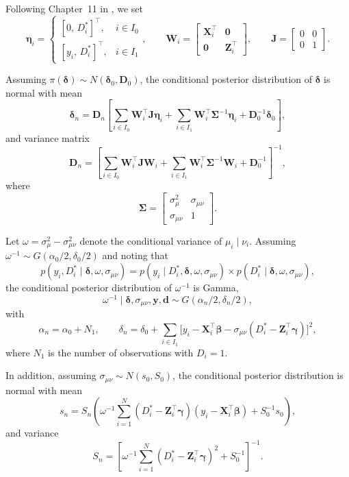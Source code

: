 Following Chapter~11 in \cite{greenberg2012introduction}, we set
\[
\boldsymbol{\eta}_i=
\begin{cases}
	[0, \, D_i^*]^{\top}, & i\in I_0\\
	[y_i, \, D_i^*]^{\top}, & i\in I_1
\end{cases},
\qquad
\mathbf{W}_i=\begin{bmatrix}
	\mathbf{X}_i^{\top} & \mathbf{0}\\
	\mathbf{0} & \mathbf{Z}_i^{\top}
\end{bmatrix}, 
\qquad
\mathbf{J}=\begin{bmatrix}
	0 & 0\\
	0 & 1
\end{bmatrix}.
\]

Assuming $\pi(\boldsymbol{\delta}) \sim N(\boldsymbol{\delta}_0,\mathbf{D}_0)$, the conditional posterior distribution of $\boldsymbol{\delta}$ is normal with mean
\[
\boldsymbol{\delta}_n=\mathbf{D}_n\left[\sum_{i\in I_0}\mathbf{W}_i^{\top}\mathbf{J}\boldsymbol{\eta}_i
+\sum_{i\in I_1}\mathbf{W}_i^{\top}\boldsymbol{\Sigma}^{-1}\boldsymbol{\eta}_i
+\mathbf{D}_0^{-1}\boldsymbol{\delta}_0\right],
\]
and variance matrix
\[
\mathbf{D}_n=\left[\sum_{i\in I_0}\mathbf{W}_i^{\top}\mathbf{J}\mathbf{W}_i
+\sum_{i\in I_1}\mathbf{W}_i^{\top}\boldsymbol{\Sigma}^{-1}\mathbf{W}_i
+\mathbf{D}_0^{-1}\right]^{-1},
\] 
where 
\[
\boldsymbol{\Sigma}=\begin{bmatrix}
	\sigma^2_{\mu} & \sigma_{\mu\nu} \\[6pt]
	\sigma_{\mu\nu} & 1
\end{bmatrix}.
\]

Let $\omega=\sigma^2_{\mu}-\sigma^2_{\mu\nu}$ denote the conditional variance of $\mu_i \mid \nu_i$. 
Assuming $\omega^{-1}\sim G(\alpha_0/2,\delta_0/2)$ and noting that
\[
p(y_i,D_i^*\mid \boldsymbol{\delta},\omega,\sigma_{\mu\nu})
= p(y_i\mid D_i^*, \boldsymbol{\delta},\omega,\sigma_{\mu\nu})
\times p(D_i^*\mid \boldsymbol{\delta},\omega,\sigma_{\mu\nu}),
\]
the conditional posterior distribution of $\omega^{-1}$ is Gamma,
\[
\omega^{-1}\mid \boldsymbol{\delta},\sigma_{\mu\nu}, \mathbf{y},\mathbf{d} \sim G(\alpha_n/2,\delta_n/2),
\]
with
\[
\alpha_n=\alpha_0+N_1,
\qquad
\delta_n=\delta_0+\sum_{i\in I_1}\Big[y_i-\mathbf{X}_i^{\top}\boldsymbol{\beta}
-\sigma_{\mu\nu}(D_i^*-\mathbf{Z}_i^{\top}\boldsymbol{\gamma})\Big]^2,
\]
where $N_1$ is the number of observations with $D_i=1$.

In addition, assuming $\sigma_{\mu\nu}\sim N(s_0,S_0)$, the conditional posterior distribution is normal with mean
\[
s_n=S_n\left(\omega^{-1}\sum_{i=1}^N(D_i^*-\mathbf{Z}_i^{\top}\boldsymbol{\gamma})(y_i-\mathbf{X}_i^{\top}\boldsymbol{\beta})
+S_0^{-1}s_0\right),
\]
and variance
\[
S_n=\left[\omega^{-1}\sum_{i=1}^N(D_i^*-\mathbf{Z}_i^{\top}\boldsymbol{\gamma})^2+S_0^{-1}\right]^{-1}.
\]

